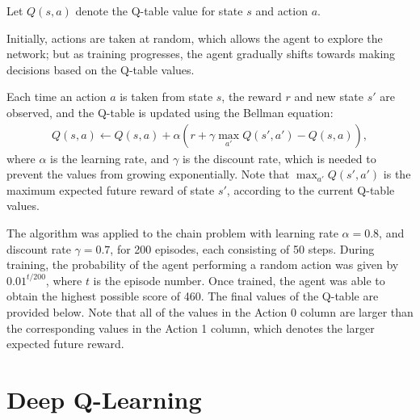 Let $Q(s,a)$ denote the Q-table value for state $s$ and action $a$.

Initially, actions are taken at random, which allows the agent to explore the
network; but as training progresses, the agent gradually shifts towards making
decisions based on the Q-table values.

Each time an action $a$ is taken from state $s$, the reward $r$ and new state
$s'$ are observed, and the Q-table is updated using the Bellman equation:
\begin{align}
    Q(s,a) \leftarrow Q(s,a) + \alpha (r + \gamma\max_{a'}Q(s',a') - Q(s,a)),
    \label{eq:RL:QL}
\end{align}
where $\alpha$ is the learning rate, and $\gamma$ is the discount rate, which is
needed to prevent the values from growing exponentially.
Note that $\max_{a'}Q(s',a')$ is the maximum expected future reward of state
$s'$, according to the current Q-table values.

The algorithm was applied to the chain problem with learning rate $\alpha =
0.8$, and discount rate $\gamma = 0.7$, for 200 episodes, each consisting of 50
steps.
During training, the probability of the agent performing a random action was
given by $0.01^{t/200}$, where $t$ is the episode number.
Once trained, the agent was able to obtain the highest possible score of 460.
The final values of the Q-table are provided below.
Note that all of the values in the Action 0 column are larger than the
corresponding values in the Action 1 column, which denotes the larger expected
future reward.



\section{Deep Q-Learning}


